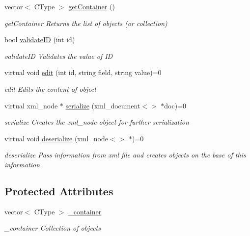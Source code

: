 \begin{DoxyCompactItemize}
vector$<$ C\-Type $>$ \hyperlink{class_controller_a92fe74ba878f98ed1fc8272771680e90}{get\-Container} ()
\begin{DoxyCompactList}\small\item\em get\-Container Returns the list of objects (or collection) \end{DoxyCompactList}\item 
bool \hyperlink{class_controller_a102169af91cac5b2ebaec9c357580058}{validate\-I\-D} (int id)
\begin{DoxyCompactList}\small\item\em validate\-I\-D Validates the value of I\-D \end{DoxyCompactList}\item 
virtual void \hyperlink{class_controller_ae0a60f517aa957a9b40787385e2f574d}{edit} (int id, string field, string value)=0
\begin{DoxyCompactList}\small\item\em edit Edits the content of object \end{DoxyCompactList}\item 
virtual xml\-\_\-node $\ast$ \hyperlink{class_controller_ad64a54b0dae9862661873423e4623d12}{serialize} (xml\-\_\-document$<$$>$ $\ast$doc)=0
\begin{DoxyCompactList}\small\item\em serialize Creates the xml\-\_\-node object for further serialization \end{DoxyCompactList}\item 
virtual void \hyperlink{class_controller_a5a640056935508649724441454e0d996}{deserialize} (xml\-\_\-node$<$$>$ $\ast$)=0
\begin{DoxyCompactList}\small\item\em deserialize Pass information from xml file and creates objects on the base of this information \end{DoxyCompactList}\end{DoxyCompactItemize}
\subsection*{Protected Attributes}
\begin{DoxyCompactItemize}
\item 
vector$<$ C\-Type $>$ \hyperlink{class_controller_a35c624141b5dafd2314829c910db7f9b}{\-\_\-container}
\begin{DoxyCompactList}\small\item\em \-\_\-container Collection of objects \end{DoxyCompactList}\end{DoxyCompactItemize}


